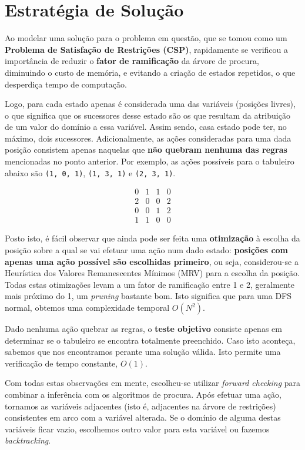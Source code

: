 \documentclass[12pt,a4paper]{article}
\begin{document}
\section{Estratégia de Solução}

Ao modelar uma solução para o problema em questão, que se tomou como um \textbf{Problema de Satisfação de Restrições (CSP)},
rapidamente se verificou a importância de reduzir
o \textbf{fator de ramificação} da árvore de procura, diminuindo o custo de memória,
e evitando a criação de estados repetidos, o que desperdiça tempo de computação.

Logo, para cada estado apenas é considerada uma das variáveis (posições livres), o que significa
que os sucessores desse estado são os que resultam da atribuição de um valor do domínio a essa variável.
Assim sendo, casa estado pode ter, no máximo, dois sucessores.
Adicionalmente, as ações consideradas para uma dada posição consistem apenas naquelas que
\textbf{não quebram nenhuma das regras} mencionadas no ponto anterior.
Por exemplo, as ações possíveis para o tabuleiro abaixo são
\texttt{(1, 0, 1)}, \texttt{(1, 3, 1)} e \texttt{(2, 3, 1)}.

\[
  \begin{array}{cccc}
    0 & 1 & 1 & 0 \\
    2 & 0 & 0 & 2 \\
    0 & 0 & 1 & 2 \\
    1 & 1 & 0 & 0
  \end{array}
\]

Posto isto, é fácil observar que ainda pode ser feita uma \textbf{otimização} à escolha da
posição sobre a qual se vai efetuar uma ação num dado estado:
\textbf{posições com apenas uma ação possível são escolhidas primeiro},
ou seja, considerou-se a Heurística dos Valores Remanescentes Mínimos (MRV) para
a escolha da posição.
Todas estas otimizações levam a um fator de ramificação entre 1 e 2,
geralmente mais próximo do 1, um \textit{pruning} bastante bom.
Isto significa que para uma DFS normal, obtemos uma complexidade temporal \(O(N^2)\).

Dado nenhuma ação quebrar as regras, o \textbf{teste objetivo} consiste apenas em determinar
se o tabuleiro se encontra totalmente preenchido. Caso isto aconteça, sabemos que
nos encontramos perante uma solução válida. Isto permite uma verificação de tempo constante, \(O(1)\).

Com todas estas observações em mente, escolheu-se utilizar \textit{forward checking} para combinar
a inferência com os algoritmos de procura. Após efetuar uma ação, tornamos as variáveis
adjacentes (isto é, adjacentes na árvore de restrições) consistentes em arco com a variável alterada.
Se o domínio de alguma destas variáveis ficar vazio, escolhemos outro valor para esta variável ou
fazemos \textit{backtracking}.
\end{document}
